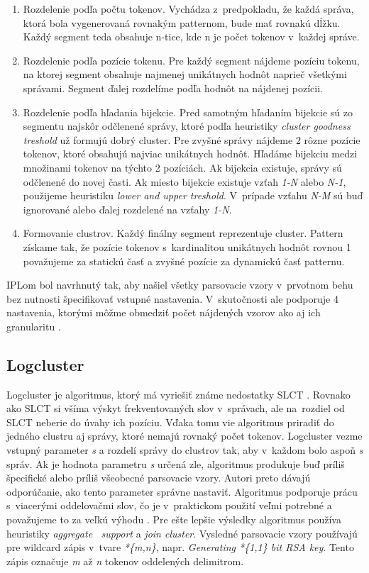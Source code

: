 \begin{enumerate}
  \item Rozdelenie podľa počtu tokenov. Vychádza z~predpokladu, že každá správa, ktorá bola vygenerovaná rovnakým patternom, bude mať rovnakú dĺžku. Každý segment teda obsahuje n-tice, kde n je počet tokenov v~každej správe.
  \item Rozdelenie podľa pozície tokenu. Pre každý segment nájdeme pozíciu tokenu, na ktorej segment obsahuje najmenej unikátnych hodnôt naprieč všetkými správami. Segment ďalej rozdelíme podľa hodnôt na nájdenej pozícii.
  \item Rozdelenie podľa hľadania bijekcie. Pred samotným hľadaním bijekcie sú zo segmentu najskôr odčlenené správy, ktoré podľa heuristiky \emph{cluster goodness treshold} už formujú dobrý cluster. Pre zvyšné správy nájdeme 2 rôzne pozície tokenov, ktoré obsahujú najviac unikátnych hodnôt. Hľadáme bijekciu medzi množinami tokenov na týchto 2 pozíciách. Ak bijekcia existuje, správy sú odčlenené do novej časti. Ak miesto bijekcie existuje vzťah \emph{1-N} alebo \emph{N-1}, použijeme heuristiku \emph{lower and upper treshold}. V~prípade vzťahu \emph{N-M} sú buď ignorované alebo ďalej rozdelené na vzťahy \emph{1-N}.
  \item Formovanie clustrov. Každý finálny segment reprezentuje cluster. Pattern získame tak, že pozície tokenov s~kardinalitou unikátnych hodnôt rovnou 1 považujeme za statickú časť a zvyšné pozície za dynamickú časť patternu.
\end{enumerate}

IPLom bol navrhnutý tak, aby našiel všetky parsovacie vzory v~prvotnom behu bez nutnosti špecifikovať vstupné nastavenia. V~skutočnosti ale podporuje 4 nastavenia, ktorými môžme obmedziť počet nájdených vzorov ako aj ich granularitu \parencite{nagappanvouk}.

\subsection{Logcluster}

Logcluster je algoritmus, ktorý má vyriešiť známe nedostatky SLCT \parencite{logcluster}. Rovnako ako SLCT si všíma výskyt frekventovaných slov v~správach, ale na~rozdiel od SLCT neberie do úvahy ich pozíciu. Vďaka tomu vie algoritmus priradiť do jedného clustru aj správy, ktoré nemajú rovnaký počet tokenov. Logcluster vezme vstupný parameter \emph{s}  a rozdelí správy do clustrov tak, aby v~každom bolo aspoň \emph{s} správ. Ak je hodnota parametru \emph{s} určená zle, algoritmus produkuje buď príliš špecifické alebo príliš všeobecné parsovacie vzory. Autori preto dávajú odporúčanie, ako tento parameter správne nastaviť. Algoritmus podporuje prácu s~viacerými oddelovačmi slov, čo je v~praktickom použití veľmi potrebné a považujeme to za veľkú výhodu \parencite{logclustertool}. Pre ešte lepšie výsledky algoritmus používa heuristiky \emph{aggregate \, support} a \emph{join cluster}. Vysledné parsovacie vzory používajú pre wildcard zápis v~tvare \emph{*\{m,n\}}, napr. \emph{Generating *\{1,1\} bit RSA key}. Tento zápis označuje \emph{m} až \emph{n} tokenov oddelených delimitrom.


